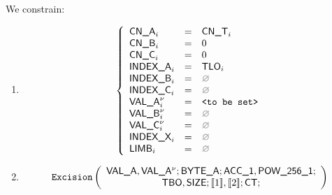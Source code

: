 \begin{center}
\end{center}

We constrain:
\begin{enumerate}
	\item 
\[
	\left\{
	\begin{array}{lclr}
		\cnA      _{i}       & = & \cnT_{i}            \\
		\cnB      _{i}       & = & 0                   \\
		\cnC      _{i}       & = & 0                   \\
		\indexA   _{i}       & = & \tlo_{i}            \\
		\indexB   _{i}       & = & \nothing            \\
		\indexC   _{i}       & = & \nothing            \\
		\valA     _{i}\new{} & = & \valueToBeSet       \\
		\valB     _{i}\new{} & = & \nothing            \\
		\valC     _{i}\new{} & = & \nothing            \\
		\indexX   _{i}       & = & \nothing            \\
		\limb     _{i}       & = & \nothing            \\
	\end{array}
	\right.
\]
	\item 
\[
	\texttt{Excision}{}
	\left(
	\begin{array}{c}
		\textsf{VAL\_A}{}, \textsf{VAL\_A}{}^{\nu}{}; \textsf{BYTE\_A}{};
		\textsf{ACC}\textsf{\_1}, \textsf{POW\_256\_1}; \\
		\textsf{TBO}{}, \textsf{SIZE}{};
		[\![1]\!], [\![2]\!]; \textsf{CT}{};
	\end{array}
	\right)
\]
\end{enumerate}

